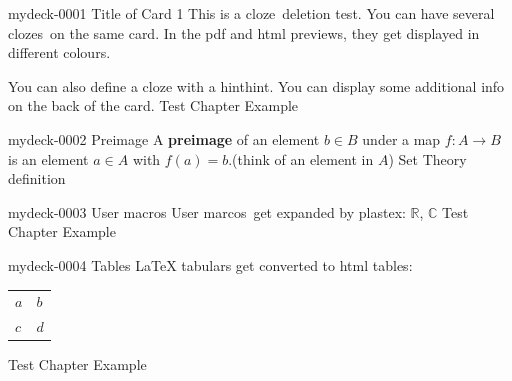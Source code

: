\documentclass[10pt]{article}
\newcommand{\CC}{\mathbb{C}}
\newcommand{\RR}{\mathbb{R}}
\begin{document}
\begin{note}{mydeck-0001}
  \field Title of Card 1
  \field
  This is a cloze\clend\
  deletion test.  You can have several clozes\clend\ on the same card.
  In the pdf and html previews, they get displayed in different colours.

  You can also define a cloze with a hint\hint hint\clend.
  \field
  You can display some additional info on the back of the card.
  \field Test Chapter
  \field Example 
\end{note}
 
\begin{note}{mydeck-0002}
  \field Preimage
  \field
  A \textbf{preimage} of an element \(b \in B\) under a map \(f\colon A\to B\) is an element \(a\in A\) with \(f(a) = b\).\hint (think of an element in \(A\))\clend    
  \field  
  \field Set Theory
  \field definition
\end{note}
 
\begin{note}{mydeck-0003}
  \field
  User macros
  \field
  User marcos\clend\ get expanded by plastex: \(\RR\), \(\CC\)
  \field
  \field Test Chapter
  \field Example
\end{note}

\begin{note}{mydeck-0004}
  \field
  Tables
  \field
  LaTeX tabulars get converted to html tables:
  \begin{center}
    \begin{tabular}{ll}
      \(a\) & \(b\) \\
      \(c\) & \(d\)
    \end{tabular}
  \end{center}
  \clend
  \field
  \field Test Chapter
  \field Example
\end{note}
\end{document}
